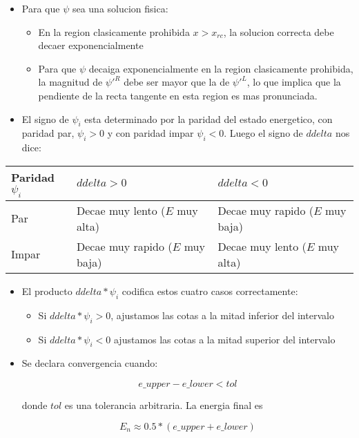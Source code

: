 \documentclass[11pt]{article}
\begin{document}
\begin{itemize}
\item Para que \(\psi\) sea una solucion fisica:

\begin{itemize}
\item En la region clasicamente prohibida \(x> x_{rc}\), la solucion correcta debe decaer exponencialmente

\item Para que \(\psi\) decaiga exponencialmente en la region clasicamente prohibida, la magnitud de \({\psi'}^R\) debe ser mayor que la de \({\psi'}^L\), lo que implica que la pendiente de la recta tangente en esta region es mas pronunciada.
\end{itemize}

\item El signo de \(\psi_i\) esta determinado por la paridad del estado energetico, con paridad par, \(\psi_i > 0\) y con paridad impar \(\psi_i< 0\). Luego el signo de \(ddelta\) nos dice:
\end{itemize}

\begin{center}
\begin{tabular}{lll}
Paridad \(\psi_i\) & \(ddelta > 0\) & \(ddelta < 0\)\\
\hline
Par & Decae muy lento (\(E\) muy alta) & Decae muy rapido (\(E\) muy baja)\\
Impar & Decae muy rapido (\(E\) muy baja) & Decae muy lento (\(E\) muy alta)\\
\hline
\end{tabular}
\end{center}

\begin{itemize}
\item El producto \(ddelta * \psi_i\) codifica estos cuatro casos correctamente:

\begin{itemize}
\item Si \(ddelta * \psi_i > 0\), ajustamos las cotas a la mitad inferior del intervalo

\item Si \(ddelta * \psi_i < 0\) ajustamos las cotas a la mitad superior del intervalo
\end{itemize}

\item Se declara convergencia cuando:

\[ e\_upper - e\_lower < tol \]

donde \(tol\) es una tolerancia arbitraria. La energia final es

\[ E_n \approx 0.5 * (e\_upper + e\_lower) \]
\end{itemize}
\end{document}
